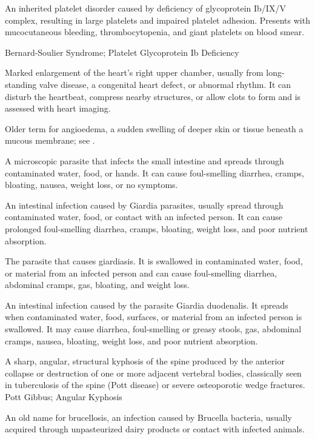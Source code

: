 An inherited platelet disorder caused by deficiency of glycoprotein Ib/IX/V complex, resulting in large platelets and impaired platelet adhesion. Presents with mucocutaneous bleeding, thrombocytopenia, and giant platelets on blood smear.

\synonyms
Bernard-Soulier Syndrome; Platelet Glycoprotein Ib Deficiency

 Marked enlargement of the heart’s right upper chamber, usually from long-standing valve disease, a congenital heart defect, or abnormal rhythm. It can disturb the heartbeat, compress nearby structures, or allow clots to form and is assessed with heart imaging.

 Older term for angioedema, a sudden swelling of deeper skin or tissue beneath a mucous membrane; see .

 A microscopic parasite that infects the small intestine and spreads through contaminated water, food, or hands. It can cause foul-smelling diarrhea, cramps, bloating, nausea, weight loss, or no symptoms.

 An intestinal infection caused by Giardia parasites, usually spread through contaminated water, food, or contact with an infected person. It can cause prolonged foul-smelling diarrhea, cramps, bloating, weight loss, and poor nutrient absorption.

 The parasite that causes giardiasis. It is swallowed in contaminated water, food, or material from an infected person and can cause foul-smelling diarrhea, abdominal cramps, gas, bloating, and weight loss.

 An intestinal infection caused by the parasite Giardia duodenalis. It spreads when contaminated water, food, surfaces, or material from an infected person is swallowed. It may cause diarrhea, foul-smelling or greasy stools, gas, abdominal cramps, nausea, bloating, weight loss, and poor nutrient absorption.

 A sharp, angular, structural kyphosis of the spine produced by the anterior collapse or destruction of one or more adjacent vertebral bodies, classically seen in tuberculosis of the spine (Pott disease) or severe osteoporotic wedge fractures.
\synonyms
Pott Gibbus; Angular Kyphosis

 An old name for brucellosis, an infection caused by Brucella bacteria, usually acquired through unpasteurized dairy products or contact with infected animals.

